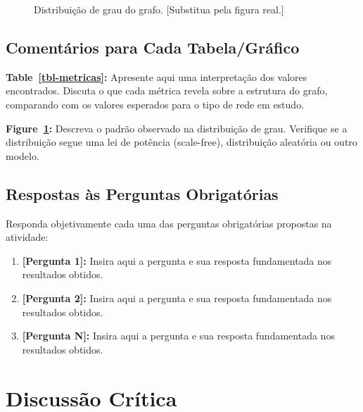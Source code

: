 \documentclass[sigconf]{webmedia}
\providecommand{\tightlist}{%
  \setlength{\itemsep}{0pt}\setlength{\parskip}{0pt}}
\begin{document}
\begin{figure}


\caption{\label{fig-dist-grau}Distribuição de grau do grafo.
{[}Substitua pela figura real.{]}}

\end{figure}%

\subsection{Comentários para Cada
Tabela/Gráfico}\label{comentuxe1rios-para-cada-tabelagruxe1fico}

\textbf{Table~\ref{tbl-metricas}:} Apresente aqui uma interpretação dos
valores encontrados. Discuta o que cada métrica revela sobre a estrutura
do grafo, comparando com os valores esperados para o tipo de rede em
estudo.

\textbf{Figure~\ref{fig-dist-grau}:} Descreva o padrão observado na
distribuição de grau. Verifique se a distribuição segue uma lei de
potência (scale-free), distribuição aleatória ou outro modelo.

\subsection{Respostas às Perguntas
Obrigatórias}\label{respostas-uxe0s-perguntas-obrigatuxf3rias}

Responda objetivamente cada uma das perguntas obrigatórias propostas na
atividade:

\begin{enumerate}
\def\labelenumi{\arabic{enumi}.}
\tightlist
\item
  \textbf{{[}Pergunta 1{]}:} Insira aqui a pergunta e sua resposta
  fundamentada nos resultados obtidos.
\item
  \textbf{{[}Pergunta 2{]}:} Insira aqui a pergunta e sua resposta
  fundamentada nos resultados obtidos.
\item
  \textbf{{[}Pergunta N{]}:} Insira aqui a pergunta e sua resposta
  fundamentada nos resultados obtidos.
\end{enumerate}

\section{Discussão Crítica}\label{discussuxe3o-cruxedtica}
\end{document}
